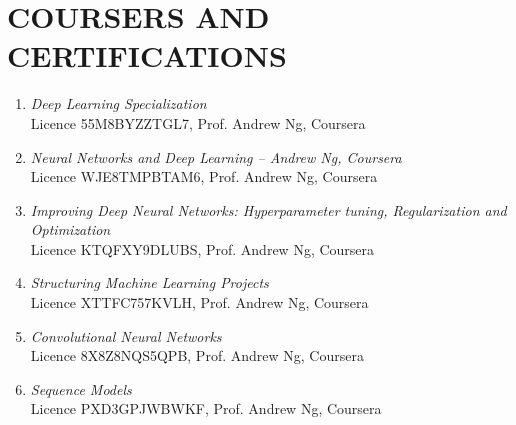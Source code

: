 \section*{COURSERS AND CERTIFICATIONS}
    \begin{enumerate}[leftmargin=0.45cm, itemsep=0em, topsep=0.5em, parsep=0.2em]
        \item \emph{Deep Learning Specialization}\\
        Licence 55M8BYZZTGL7, Prof. Andrew Ng, Coursera
        \item \emph{Neural Networks and Deep Learning – Andrew Ng, Coursera}\\
        Licence WJE8TMPBTAM6, Prof. Andrew Ng, Coursera
        \item \emph{Improving Deep Neural Networks: Hyperparameter tuning, Regularization and Optimization} \\
        Licence KTQFXY9DLUBS, Prof. Andrew Ng, Coursera
        \item \emph{Structuring Machine Learning Projects} \\
        Licence XTTFC757KVLH, Prof. Andrew Ng, Coursera
        \item \emph{Convolutional Neural Networks}\\
        Licence 8X8Z8NQS5QPB, Prof. Andrew Ng, Coursera
        \item \emph{Sequence Models}\\
        Licence PXD3GPJWBWKF, Prof. Andrew Ng, Coursera

    \end{enumerate}
